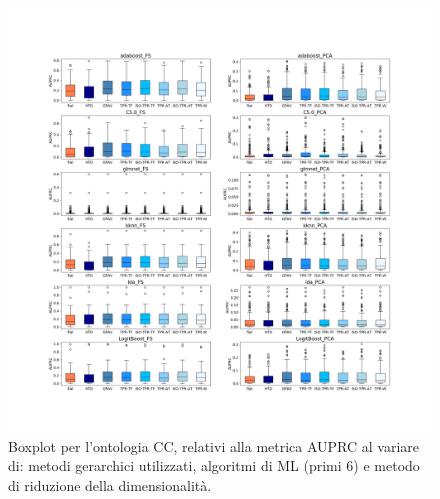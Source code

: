 \documentclass[12pt]{report}
\begin{document}
\begin{appendices}
\begin{figure}[h]
 \hspace*{-2.6cm}
\includegraphics[scale=0.34]{./images/CC_PRC_1.png}
\caption{\footnotesize{Boxplot per l'ontologia CC, relativi alla metrica AUPRC al variare di: metodi gerarchici utilizzati, algoritmi di ML (primi 6) e metodo di riduzione della dimensionalità.}}
\label{CC_PRC_1}
\end{figure}



\end{appendices}
\end{document}
